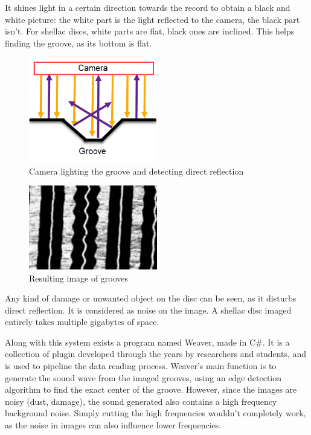 \documentclass[12pt, twoside]{article}
\begin{document}
It shines light in a certain direction towards the record to obtain a black and white picture: the white part is the light reflected to the camera, the black part isn't. For shellac discs, white parts are flat, black ones are inclined. This helps finding the groove, as its bottom is flat.
\begin{figure}[H]
	\centering
	\includegraphics[width=0.5\textwidth]{grooveside.png}
	\caption{Camera lighting the groove and detecting direct reflection}
	\label{grooveside}
\end{figure}
\begin{figure}[H]
	\centering
	\includegraphics[width=0.5\textwidth]{groove.png}
	\caption{Resulting image of grooves}
	\label{groove}
\end{figure}
Any kind of damage or unwanted object on the disc can be seen, as it disturbs direct reflection. It is considered as noise on the image. A shellac disc imaged entirely takes multiple gigabytes of space.

Along with this system exists a program named Weaver, made in C\#. It is a collection of plugin developed through the years by researchers and students, and is used to pipeline the data reading process. Weaver's main function is to generate the sound wave from the imaged grooves, using an edge detection algorithm to find the exact center of the groove. However, since the images are noisy (dust, damage), the sound generated also contains a high frequency background noise. Simply cutting the high frequencies wouldn't completely work, as the noise in images can also influence lower frequencies.
\end{document}

